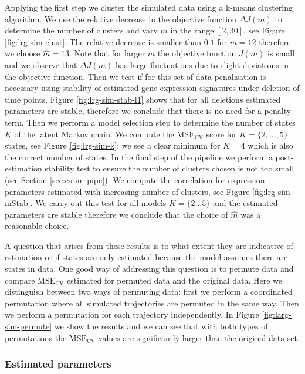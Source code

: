 Applying the first step we cluster the simulated data using a k-means clustering algorithm. We use the relative decrease in the objective function $\Delta J(m)$ to determine the number of clusters and vary $m$ in the range $[2, 30]$, see Figure \ref{fig:lrg-sim-clust}. The relative decrease is smaller than $0.1$ for $m=12$ therefore we choose $\hat{m} = 13$. Note that for larger $m$ the objective function $J(m)$ is small and we observe that $\Delta J(m)$ has large fluctuations due to slight deviations in the objective function. Then we test if for this set of data penalisation is necessary using stability of estimated gene expression signatures under deletion of time points. Figure \ref{fig:lrg-sim-stab-l1} shows that for all deletions estimated parameters are stable, therefore we conclude that there is no need for a penalty term. Then we perform a model selection step to determine the number of states $K$ of the latent Markov chain. We compute the $\mathrm{MSE_{CV}}$ score for $K=\lbrace 2, \ldots, 5 \rbrace$ states, see Figure \ref{fig:lrg-sim-k}; we see a clear minimum for $K=4$ which is also the correct number of states. In the final step of the pipeline we perform a post-estimation stability test to ensure the number of clusters chosen is not too small (see Section \ref{sec:estim-pipe}). We compute the correlation for expression parameters estimated with increasing number of clusters, see Figure \ref{fig:lrg-sim-mStab}. We carry out this test for all models $K = \lbrace 2 \ldots 5\rbrace $ and the estimated parameters are stable therefore we conclude that the choice of $\hat{m}$ was a reasonable choice. 

A question that arises from these results is to what extent they are indicative of estimation or if states are only estimated because the model assumes there are states in data. One good way of addressing this question is to permute data and compare  $\mathrm{MSE_{CV}}$ estimated for permuted data and the original data. Here we distinguish between two ways of permuting data: first we perform a coordinated permutation where all simulated trajectories are permuted in the same way. Then we perform a permutation for each trajectory independently. In Figure \ref{fig:larg-sim-permute} we show the results and we can see that with both types of permutations the $\mathrm{MSE_{CV}}$ values are significantly larger than the original data set.


\subsubsection{Estimated parameters}
\label{sec:transition-rates}

